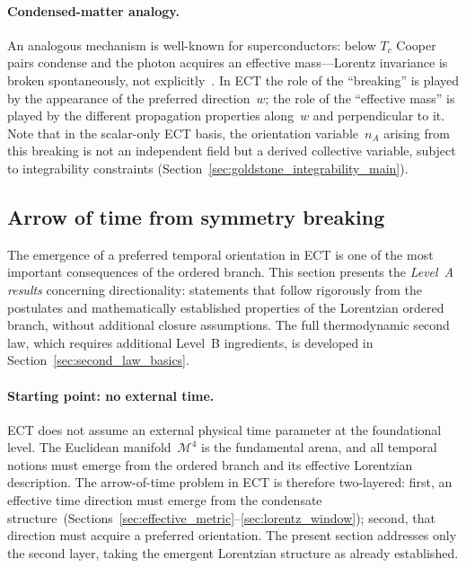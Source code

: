\documentclass[11pt,a4paper]{article}
\numberwithin{equation}{section}
\begin{document}
\paragraph{Condensed-matter analogy.}
An analogous mechanism is well-known for superconductors: below $T_c$
Cooper pairs condense and the photon acquires an effective mass---Lorentz
invariance is broken spontaneously, not explicitly~\cite{Nambu1960}.
In ECT the role of the ``breaking'' is played by the appearance of the
preferred direction~$w$; the role of the ``effective mass'' is played
by the different propagation properties along~$w$ and perpendicular to it.
Note that in the scalar-only ECT basis, the orientation variable~$n_A$
arising from this breaking is not an independent field but a derived
collective variable, subject to integrability constraints
(Section~\ref{sec:goldstone_integrability_main}).

\subsection{Arrow of time from symmetry breaking}
\label{sec:arrow_of_time}

The emergence of a preferred temporal orientation in ECT is one of the
most important consequences of the ordered branch.
This section presents the \emph{Level~A results} concerning
directionality: statements that follow rigorously from the postulates
and mathematically established properties of the Lorentzian ordered
branch, without additional closure assumptions.
The full thermodynamic second law, which requires additional Level~B
ingredients, is developed in Section~\ref{sec:second_law_basics}.

\paragraph{Starting point: no external time.}
ECT does not assume an external physical time parameter at the
foundational level.
The Euclidean manifold~$\mathcal{M}^4$ is the fundamental arena, and
all temporal notions must emerge from the ordered branch and its
effective Lorentzian description.
The arrow-of-time problem in ECT is therefore two-layered:
first, an effective time direction must emerge from the condensate
structure~(Sections~\ref{sec:effective_metric}--\ref{sec:lorentz_window});
second, that direction must acquire a preferred orientation.
The present section addresses only the second layer, taking the
emergent Lorentzian structure as already established.
\end{document}
